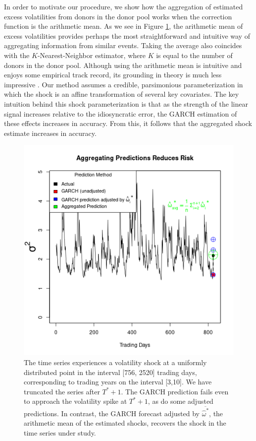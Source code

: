 \documentclass[11pt]{article}
\theoremstyle{definition}
\begin{document}
In order to motivate our procedure, we show how the aggregation of estimated excess volatilities from donors in the donor pool works when the correction function is the arithmetic mean.  As we see in Figure \ref{fig:arith_mean_example_introduction}, the arithmetic mean of excess volatilities provides perhaps the most straightforward and intuitive way of aggregating information from similar events.  Taking the average also coincides with the $K$-Nearest-Neighbor estimator, where $K$ is equal to the number of donors in the donor pool. Although using the arithmetic mean is intuitive and enjoys some empirical track record, its grounding in theory is much less impressive \citep{timmermann2006forecast}.  Our method assumes a credible, parsimonious parameterization in which the shock is an affine transformation of several key covariates.  The key intuition behind this shock parameterization is that as the strength of the linear signal increases relative to the idiosyncratic error, the GARCH estimation of these effects increases in accuracy.  From this, it follows that the aggregated shock estimate increases in accuracy. 

  \begin{figure}[h]
    \begin{center}
      \includegraphics[scale=.7]{simulation_plots/USE_in_paper_simulation_plot_arithmetic_mean.png}
      \caption{The time series experiences a volatility shock at a uniformly distributed point in the interval [756, 2520] trading days, corresponding to trading years on the interval [3,10].  We have truncated the series after $T^{*}+1$.  The GARCH prediction fails even to approach the volatility spike at $T^{*}+1$, as do some adjusted predictions.  In contrast, the GARCH forecast adjusted by $\overline{\hat\omega^{*}}$, the arithmetic mean of the estimated shocks, recovers the shock in the time series under study.} 
      \label{fig:arith_mean_example_introduction}
      \end{center}
    \end{figure}
\end{document}
